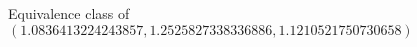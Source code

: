 \documentclass[preview]{standalone}
\begin{document}
\begin{center}
Equivalence class of $(1.0836413224243857, 1.2525827338336886, 1.1210521750730658)$
\end{center}
\end{document}
